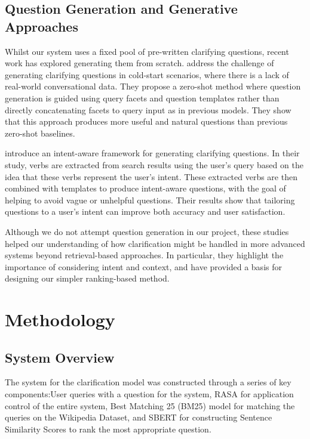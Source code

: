 \documentclass[11pt]{article}
\begin{document}
\subsection{Question Generation and Generative Approaches}
Whilst our system uses a fixed pool of pre-written clarifying questions, recent work has explored generating them from scratch. \citet{Wang2023} address the challenge of generating clarifying questions in cold-start scenarios, where there is a lack of real-world conversational data. They propose a zero-shot method where question generation is guided using query facets and question templates rather than directly concatenating facets to query input as in previous models. They show that this approach produces more useful and natural questions than previous zero-shot baselines.

\citet{Zhao2024} introduce an intent-aware framework for generating clarifying questions. In their study, verbs are extracted from search results using the user's query based on the idea that these verbs represent the user's intent. These extracted verbs are then combined with templates to produce intent-aware questions, with the goal of helping to avoid vague or unhelpful questions. Their results show that tailoring questions to a user's intent can improve both accuracy and user satisfaction.

Although we do not attempt question generation in our project, these studies helped our understanding of how clarification might be handled in more advanced systems beyond retrieval-based approaches. In particular, they highlight the importance of considering intent and context, and have provided a basis for designing our simpler ranking-based method.

\section{Methodology}



\subsection{System Overview}
The system for the clarification model was constructed through a series of key components:User queries with a question for the system, RASA for application control of the entire system, Best Matching 25 (BM25) model for matching the queries on the Wikipedia Dataset, and SBERT for constructing Sentence Similarity Scores to rank the most appropriate question.
\end{document}
